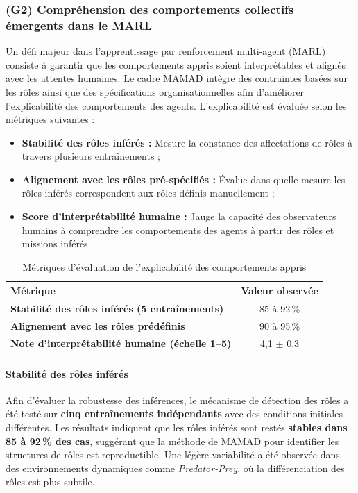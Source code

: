 \subsubsection{(G2) Compréhension des comportements collectifs émergents dans le MARL}

Un défi majeur dans l'apprentissage par renforcement multi-agent (MARL) consiste à garantir que les comportements appris soient interprétables et alignés avec les attentes humaines. Le cadre MAMAD intègre des contraintes basées sur les rôles ainsi que des spécifications organisationnelles afin d'améliorer l'explicabilité des comportements des agents. L'explicabilité est évaluée selon les métriques suivantes :

\begin{itemize}
    \item \textbf{Stabilité des rôles inférés :} Mesure la constance des affectations de rôles à travers plusieurs entraînements ;
    \item \textbf{Alignement avec les rôles pré-spécifiés :} Évalue dans quelle mesure les rôles inférés correspondent aux rôles définis manuellement ;
    \item \textbf{Score d'interprétabilité humaine :} Jauge la capacité des observateurs humains à comprendre les comportements des agents à partir des rôles et missions inférés.
\end{itemize}

\begin{table}[h!]
    \centering
    \caption{Métriques d'évaluation de l'explicabilité des comportements appris}
    \begin{tabular}{lc}
        \hline
        \textbf{Métrique}                                       & \textbf{Valeur observée} \\
        \hline
        \textbf{Stabilité des rôles inférés (5 entraînements)} & 85 à 92\,\%              \\
        \hline
        \textbf{Alignement avec les rôles prédéfinis}          & 90 à 95\,\%              \\
        \hline
        \textbf{Note d'interprétabilité humaine (échelle 1–5)} & 4{,}1 $\pm$ 0{,}3        \\
        \hline
    \end{tabular}
    \label{tab:explainability}
\end{table}

\paragraph{Stabilité des rôles inférés}
Afin d'évaluer la robustesse des inférences, le mécanisme de détection des rôles a été testé sur \textbf{cinq entraînements indépendants} avec des conditions initiales différentes. Les résultats indiquent que les rôles inférés sont restés \textbf{stables dans 85 à 92\,\% des cas}, suggérant que la méthode de MAMAD pour identifier les structures de rôles est reproductible. Une légère variabilité a été observée dans des environnements dynamiques comme \textit{Predator-Prey}, où la différenciation des rôles est plus subtile.

